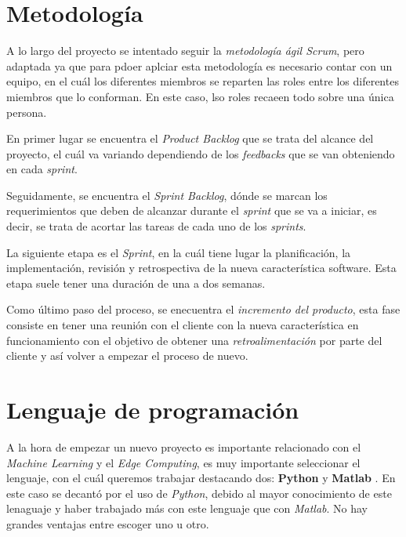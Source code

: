 
\section{Metodología}
A lo largo del proyecto se intentado seguir la \textit{metodología ágil Scrum}, pero adaptada ya que para pdoer aplciar esta metodología es necesario contar con un equipo, en el cuál los diferentes miembros se reparten las roles entre los diferentes miembros que lo conforman. En este caso, lso roles recaeen todo sobre una única persona.


En primer lugar se encuentra el \textit{Product Backlog} \cite{scrum} que se trata del alcance del proyecto, el cuál va variando dependiendo de los \textit{feedbacks} que se van obteniendo en cada \textit{sprint}.

Seguidamente, se encuentra el \textit{Sprint Backlog}, dónde se marcan los requerimientos que deben de alcanzar durante el \textit{sprint} que se va a iniciar, es decir, se trata de acortar las tareas de cada uno 
de los \textit{sprints}.

La siguiente etapa es el \textit{Sprint}, en la cuál tiene lugar la planificación, la implementación, revisión y retrospectiva de la nueva característica software.
Esta etapa suele tener una duración de una a dos semanas.

Como último paso del proceso, se enecuentra el \textit{incremento del producto}, esta fase consiste en tener una reunión con el cliente con la nueva característica en funcionamiento con el objetivo de obtener una \textit{retroalimentación} por parte del cliente y así volver a empezar el proceso de nuevo.


\section{Lenguaje de programación}
A la hora de empezar un nuevo proyecto es importante relacionado con el \textit{Machine Learning} y el \textit{Edge Computing}, es muy importante seleccionar el lenguaje, con el cuál queremos trabajar destacando dos: \textbf{Python} \cite{python} y \textbf{Matlab} \cite{matlab}.
En este caso se decantó por el uso de \textit{Python}, debido al mayor conocimiento de este lenaguaje y haber trabajado más con este lenguaje que con \textit{Matlab}.
No hay grandes ventajas entre escoger uno u otro.


